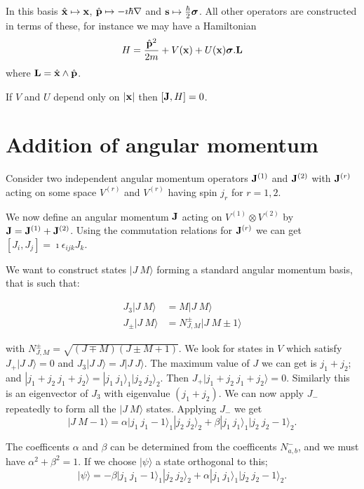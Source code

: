 \documentclass{notes}
\newcommand{\ket}[1]{|#1\rangle}
\newcommand{\com}[2]{\left[#1,#2\right]}
\newcommand{\sv}{\boldsymbol{\sigma}}
\begin{document}
In this basis $\Hat{\mathbf{x}} \mapsto \mathbf{x}$, $\Hat{\mathbf{p}}
\mapsto - \imath \hbar \nabla$ and $\vect{s} \mapsto \frac{\hbar}{2}
\sv$.  All other operators are constructed in terms of these, for
instance we may have a Hamiltonian
\[
H = \frac{\Hat{\vect{p}}^2}{2 m} + V(\vect{x}) + U(\vect{x}) \sv.\vect{L}
\]
where $\mathbf{L} = \Hat{\mathbf{x}} \wedge \Hat{\mathbf{p}}$.

If $V$ and $U$ depend only on $\left|\mathbf{x}\right|$ then $\com{\vect{J}}{H} = 0$.

\section{Addition of angular momentum}

Consider two independent angular momentum operators $\mathbf{J}^{(1)}$
and $\mathbf{J}^{(2)}$ with $\mathbf{J}^{(r)}$ acting on some space $V^{(r)}$
and $V^{(r)}$ having spin $j_r$ for $r=1,2$.

We now define an angular momentum $\mathbf{J}$ acting on $V^{(1)} \otimes
V^{(2)}$ by $\mathbf{J} = \mathbf{J}^{(1)} + \mathbf{J}^{(2)}$.  Using the
commutation relations for $\mathbf{J}^{(r)}$ we can get
$\com{J_i}{J_j} = \imath \epsilon_{i j k} J_k$.  

We want to construct states $\ket{J\ M}$ forming a standard angular momentum
basis, that is such that:

\begin{align*}
J_3 \ket{J\ M} &= M \ket{J\ M} \\
J_\pm \ket{J\ M} &= N^\pm_{J,M} \ket{J\ M \pm 1}
\end{align*}

with $N^\pm_{J,M} = \sqrt{\left(J \mp M \right) \left(J \pm M + 1
  \right)}$.  We look for states in $V$ which satisfy $J_+ \ket{J\ J}
= 0$ and $J_3 \ket{J\ J} = J \ket{J\ J}$.  The maximum value of $J$ we
can get is $j_1 + j_2$; and $\ket{j_1 + j_2\ j_1 + j_2} = \ket{j_1\ 
  j_1}_1 \ket{j_2\ j_2}_2$.  Then $J_+ \ket{j_1 + j_2\ j_1 + j_2} =
0$.  Similarly this is an eigenvector of $J_3$ with eigenvalue $\left(
  j_1 + j_2 \right)$.  We can now apply $J_-$ repeatedly to form all
the $\ket{J\ M}$ states. Applying $J_-$ we get
\[
\ket{J\ M-1} = \alpha \ket{j_1\ j_1-1}_1 \ket{j_2\ j_2}_2 
+ \beta \ket{j_1\ j_1}_1 \ket{j_2\ j_2 - 1}_2.
\]

The coefficents $\alpha$ and $\beta$ can be determined from the coefficents
$N^-_{a,b}$, and we must have $\alpha^2 + \beta^2 = 1$.  If we choose
$\ket{\psi}$ a state orthogonal to this;
\[
\ket{\psi} = - \beta
\ket{j_1\ j_1 - 1}_1 \ket{j_2\ j_2}_2 + \alpha \ket{j_1\ j_1}_1
\ket{j_2\ j_2 - 1}_2.
\]
\end{document}
